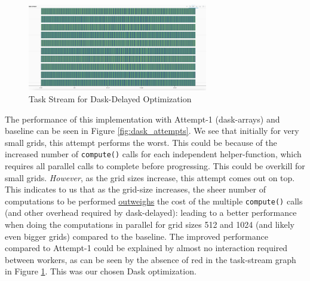 \documentclass[a4paper,10pt]{article}
\begin{document}
\begin{figure}[h]
  \centering
  \includegraphics[width=0.7\textwidth]{images/dask/dask_opt2.png}
  \caption{Task Stream for Dask-Delayed Optimization}
  \label{fig:dask_opt2_stream}
\end{figure}

The performance of this implementation with Attempt-1 (dask-arrays) and baseline can be seen in Figure \ref{fig:dask_attempts}.
We see that initially for very small grids, this attempt performs the worst.
This could be because of the increased number of \verb|compute()| calls for each independent helper-function, which requires all parallel calls to complete before progressing.
This could be overkill for small grids.
\textit{However}, as the grid sizes increase, this attempt comes out on top. This indicates to us that as the grid-size increases, the sheer number of computations to be performed \underline{outweighs} the cost of the multiple \verb|compute()| calls (and other overhead required by dask-delayed): leading to a better performance when doing the computations in parallel for grid sizes 512 and 1024 (and likely even bigger grids) compared to the baseline.
The improved performance compared to Attempt-1 could be explained by almost no interaction required between workers, as can be seen by the absence of red in the task-stream graph in Figure \ref{fig:dask_opt2_stream}.
This was our chosen Dask optimization.
\end{document}
